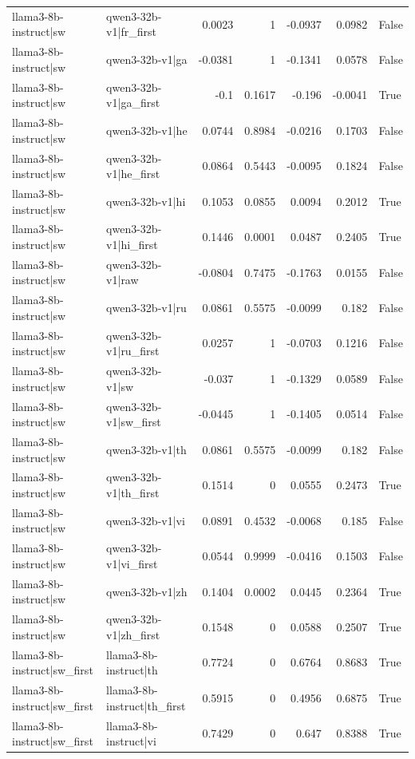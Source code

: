\begin{table}
\begin{tabular}{l l r r r r l}
llama3-8b-instruct|sw & qwen3-32b-v1|fr_first & 0.0023 & 1 & -0.0937 & 0.0982 & False \\
llama3-8b-instruct|sw & qwen3-32b-v1|ga & -0.0381 & 1 & -0.1341 & 0.0578 & False \\
llama3-8b-instruct|sw & qwen3-32b-v1|ga_first & -0.1 & 0.1617 & -0.196 & -0.0041 & True \\
llama3-8b-instruct|sw & qwen3-32b-v1|he & 0.0744 & 0.8984 & -0.0216 & 0.1703 & False \\
llama3-8b-instruct|sw & qwen3-32b-v1|he_first & 0.0864 & 0.5443 & -0.0095 & 0.1824 & False \\
llama3-8b-instruct|sw & qwen3-32b-v1|hi & 0.1053 & 0.0855 & 0.0094 & 0.2012 & True \\
llama3-8b-instruct|sw & qwen3-32b-v1|hi_first & 0.1446 & 0.0001 & 0.0487 & 0.2405 & True \\
llama3-8b-instruct|sw & qwen3-32b-v1|raw & -0.0804 & 0.7475 & -0.1763 & 0.0155 & False \\
llama3-8b-instruct|sw & qwen3-32b-v1|ru & 0.0861 & 0.5575 & -0.0099 & 0.182 & False \\
llama3-8b-instruct|sw & qwen3-32b-v1|ru_first & 0.0257 & 1 & -0.0703 & 0.1216 & False \\
llama3-8b-instruct|sw & qwen3-32b-v1|sw & -0.037 & 1 & -0.1329 & 0.0589 & False \\
llama3-8b-instruct|sw & qwen3-32b-v1|sw_first & -0.0445 & 1 & -0.1405 & 0.0514 & False \\
llama3-8b-instruct|sw & qwen3-32b-v1|th & 0.0861 & 0.5575 & -0.0099 & 0.182 & False \\
llama3-8b-instruct|sw & qwen3-32b-v1|th_first & 0.1514 & 0 & 0.0555 & 0.2473 & True \\
llama3-8b-instruct|sw & qwen3-32b-v1|vi & 0.0891 & 0.4532 & -0.0068 & 0.185 & False \\
llama3-8b-instruct|sw & qwen3-32b-v1|vi_first & 0.0544 & 0.9999 & -0.0416 & 0.1503 & False \\
llama3-8b-instruct|sw & qwen3-32b-v1|zh & 0.1404 & 0.0002 & 0.0445 & 0.2364 & True \\
llama3-8b-instruct|sw & qwen3-32b-v1|zh_first & 0.1548 & 0 & 0.0588 & 0.2507 & True \\
llama3-8b-instruct|sw_first & llama3-8b-instruct|th & 0.7724 & 0 & 0.6764 & 0.8683 & True \\
llama3-8b-instruct|sw_first & llama3-8b-instruct|th_first & 0.5915 & 0 & 0.4956 & 0.6875 & True \\
llama3-8b-instruct|sw_first & llama3-8b-instruct|vi & 0.7429 & 0 & 0.647 & 0.8388 & True \\

\end{tabular}
\end{table}
